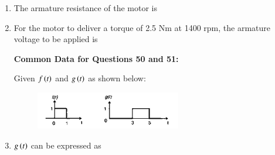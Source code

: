 \documentclass[12pt]{article}
\theoremstyle{remark}
\begin{document}
\begin{enumerate}
\item The armature resistance of the motor is
\begin{enumerate}
\end{enumerate}
\hfill{}

\item For the motor to deliver a torque of 2.5 Nm at 1400 rpm, the armature voltage to be applied is
\begin{enumerate}
\end{enumerate}
\hfill{}

\begin{flushleft}
\textbf{Common Data for Questions 50 and 51:}
\end{flushleft}
Given $f\left(t\right)$ and $g\left(t\right)$ as shown below:
\begin{figure}[H]
    \centering
    \includegraphics[width=0.6\textwidth]{Figs/Q50.png}
    \caption{}
    \label{fig:1.46}
\end{figure}

\item $g\left(t\right)$ can be expressed as
\begin{enumerate}
\end{enumerate}
\hfill{}


\end{enumerate}
\end{document}
